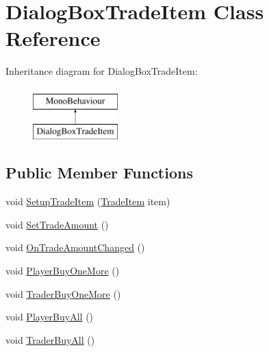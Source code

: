 \hypertarget{class_dialog_box_trade_item}{}\section{Dialog\+Box\+Trade\+Item Class Reference}
\label{class_dialog_box_trade_item}
Inheritance diagram for Dialog\+Box\+Trade\+Item\+:\begin{figure}[H]
\begin{center}
\leavevmode
\includegraphics[height=2.000000cm]{class_dialog_box_trade_item}
\end{center}
\end{figure}
\subsection*{Public Member Functions}
\begin{DoxyCompactItemize}
\item 
void \hyperlink{class_dialog_box_trade_item_ad5b6c80cfc765c75c7c6061f2789a6e5}{Setup\+Trade\+Item} (\hyperlink{class_trade_item}{Trade\+Item} item)
\item 
void \hyperlink{class_dialog_box_trade_item_ae8aa5f5a9c65fa0e00e4c8ff4211e8a7}{Set\+Trade\+Amount} ()
\item 
void \hyperlink{class_dialog_box_trade_item_ad1373047874469ad3ad00423fc90acef}{On\+Trade\+Amount\+Changed} ()
\item 
void \hyperlink{class_dialog_box_trade_item_aa31448004e07ec712f1857e93becfce9}{Player\+Buy\+One\+More} ()
\item 
void \hyperlink{class_dialog_box_trade_item_aa9976bf73208a40efce4cb67975a382b}{Trader\+Buy\+One\+More} ()
\item 
void \hyperlink{class_dialog_box_trade_item_ad4915a87cdc17c0dc61178a7539d1386}{Player\+Buy\+All} ()
\item 
void \hyperlink{class_dialog_box_trade_item_ada7966a22152342cf8050ec1b7180e13}{Trader\+Buy\+All} ()
\end{DoxyCompactItemize}
